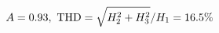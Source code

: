 \documentclass[preview]{standalone}
\begin{document}
\begin{align*}
\special{dvisvgm:raw <g id='unique000'>}A=0.93,\ \text{THD}=\sqrt{H_2^2+H_3^2}/H_1=16.5\%\special{dvisvgm:raw </g>}
\end{align*}
\end{document}
